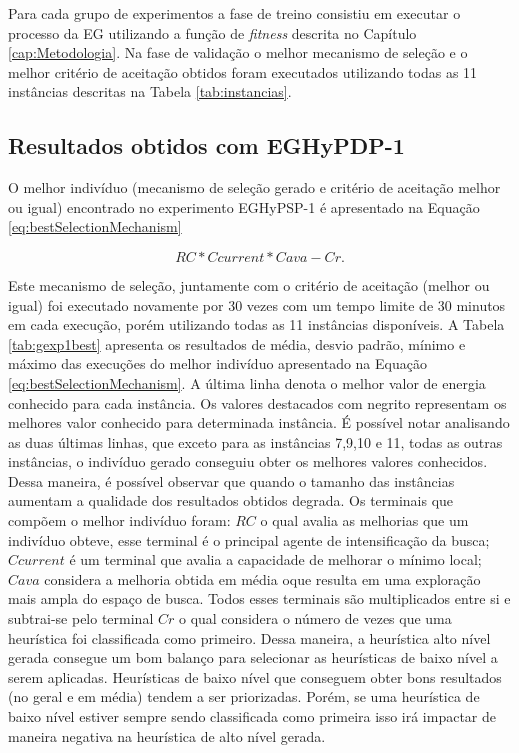 	Para cada grupo de experimentos a fase de treino consistiu em executar o processo da EG utilizando a função de \textit{fitness} descrita no Capítulo \ref{cap:Metodologia}. Na fase de validação o melhor mecanismo de seleção e o melhor critério de aceitação obtidos foram  executados utilizando todas as 11 instâncias descritas na Tabela \ref{tab:instancias}. 
	

	
	\subsection{Resultados obtidos com EGHyPDP-1}
	\label{subsection:gehypdp1results}
	
	O melhor indivíduo (mecanismo de seleção gerado e critério de aceitação melhor ou igual) encontrado no experimento EGHyPSP-1 é apresentado na Equação \ref{eq:bestSelectionMechanism}
	
	\begin{equation}
	\label{eq:bestSelectionMechanism}
	RC * Ccurrent * Cava -Cr.
	\end{equation}
	

	
	Este mecanismo de seleção, juntamente com o critério de aceitação (melhor ou igual) foi executado novamente por 30 vezes com um tempo limite de 30 minutos em cada execução, porém utilizando todas as 11 instâncias disponíveis. A Tabela  \ref{tab:gexp1best} apresenta os resultados de média, desvio padrão, mínimo e máximo das execuções do melhor indivíduo apresentado na Equação \ref{eq:bestSelectionMechanism}. A última linha denota o melhor valor de energia conhecido para cada instância. Os valores destacados com negrito representam os melhores valor conhecido para determinada instância. É possível notar analisando as duas últimas linhas, que exceto para as instâncias 7,9,10 e 11, todas as outras instâncias, o indivíduo gerado conseguiu obter os melhores valores conhecidos. Dessa maneira, é possível observar que quando o tamanho das instâncias aumentam a qualidade dos resultados obtidos degrada. Os terminais que compõem o melhor indivíduo foram: $RC$ o qual avalia as melhorias que um indivíduo obteve, esse terminal é o principal agente de intensificação da busca; $Ccurrent$ é um terminal que avalia a capacidade de melhorar o mínimo local; $Cava$ considera a melhoria obtida em média oque resulta em uma exploração mais ampla do espaço de busca. Todos esses terminais são multiplicados entre si e subtrai-se pelo terminal $Cr$ o qual considera o número de vezes que uma heurística foi classificada como primeiro. Dessa maneira, a heurística alto nível gerada consegue um bom balanço para selecionar as heurísticas de baixo nível a serem aplicadas. Heurísticas de baixo nível que conseguem obter bons resultados (no geral e em média) tendem a ser priorizadas. Porém, se uma heurística de baixo nível estiver sempre sendo classificada como primeira isso irá impactar de maneira negativa na heurística de alto nível gerada.
	

